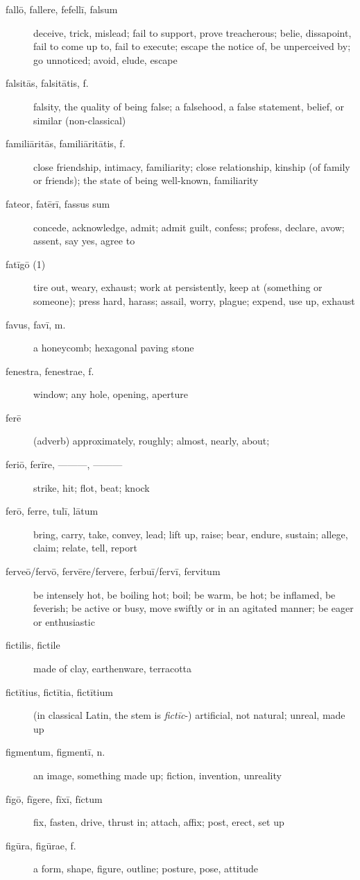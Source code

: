 \begin{description}
    \item[fallō, fallere, fefellī, falsum] \marginnote{*}deceive, trick, mislead; fail to support, prove treacherous; belie, dissapoint, fail to come up to, fail to execute; escape the notice of, be unperceived by; go unnoticed; avoid, elude, escape
    \item[falsitās, falsitātis, f.] falsity, the quality of being false; a falsehood, a false statement, belief, or similar (non-classical)
    \item[familiāritās, familiāritātis, f.] close friendship, intimacy, familiarity; close relationship, kinship (of family or friends); the state of being well-known, familiarity
    \item[fateor, fatērī, fassus sum] \marginnote{*}concede, acknowledge, admit; admit guilt, confess; profess, declare, avow; assent, say yes, agree to
    \item[fatīgō (1)] tire out, weary, exhaust; work at persistently, keep at (something or someone); press hard, harass; assail, worry, plague; expend, use up, exhaust
    \item[favus, favī, m.] a honeycomb; hexagonal paving stone
    \item[fenestra, fenestrae, f.] window; any hole, opening, aperture
    \item[ferē] (adverb) approximately, roughly; almost, nearly, about; 
    \item[feriō, ferīre, ———, ———] strike, hit; flot, beat; knock
    \item[ferō, ferre, tulī, lātum] \marginnote{*}bring, carry, take, convey, lead; lift up, raise; bear, endure, sustain; allege, claim; relate, tell, report
    \item[ferveō/fervō, fervēre/fervere, ferbuī/fervī, fervitum] be intensely hot, be boiling hot; boil; be warm, be hot; be inflamed, be feverish; be active or busy, move swiftly or in an agitated manner; be eager or enthusiastic
    \item[fictilis, fictile] made of clay, earthenware, terracotta
    \item[fictītius, fictītia, fictītium]  (in classical Latin, the stem is \textit{fictīc}-) artificial, not natural; unreal, made up
    \item[figmentum, figmentī, n.] an image, something made up; fiction, invention, unreality
    \item[fīgō, fīgere, fīxī, fīctum] fix, fasten, drive, thrust in; attach, affix; post, erect, set up
    \item[figūra, figūrae, f.] a form, shape, figure, outline; posture, pose, attitude

\end{description}
